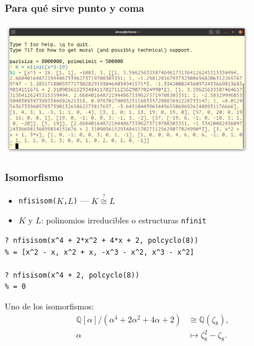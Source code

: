 \documentclass{beamer}
\newcommand{\QQ}{\mathbb{Q}}
\begin{document}

\begin{frame}[fragile]
  \frametitle{Para qué sirve punto y coma}

  \begin{center}
    \includegraphics[width=11cm]{long-output.png}
  \end{center}
\end{frame}



\begin{frame}[fragile]
  \frametitle{Isomorfismo}

  \begin{itemize}
  \item \texttt{nfisisom($K$,$L$)} --- $K \stackrel{?}{\cong} L$
  \item $K$ y $L$: polinomios irreducibles o estructuras \texttt{nfinit}
  \end{itemize}

  \begin{shaded}\footnotesize
\begin{verbatim}
? nfisisom(x^4 + 2*x^2 + 4*x + 2, polcyclo(8))
% = [x^2 - x, x^2 + x, -x^3 - x^2, x^3 - x^2]

? nfisisom(x^4 + 2, polcyclo(8))
% = 0
\end{verbatim}
  \end{shaded}

  Uno de los isomorfismos:
  \begin{align*}
  \QQ [\alpha]/(\alpha^4 + 2 \alpha^2 + 4 \alpha + 2) & \cong \QQ (\zeta_8),\\
  \alpha & \mapsto \zeta_8^2 - \zeta_8.
  \end{align*}
\end{frame}

\end{document}
